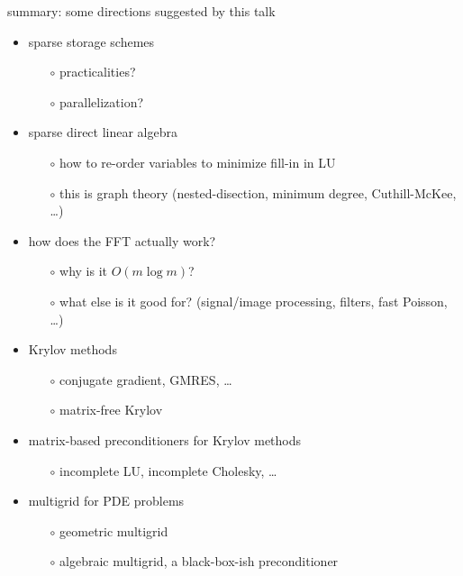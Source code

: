 \documentclass[10pt,
               svgnames,
               hyperref={colorlinks,citecolor=DeepPink4,linkcolor=FireBrick,urlcolor=Maroon},
               usepdftitle=false]{beamer}
\begin{document}
\begin{frame}{summary: some directions suggested by this talk}

\begin{itemize}
\item sparse storage schemes
   \begin{itemize}
   \item[$\circ$] practicalities?
   \item[$\circ$] parallelization?
   \end{itemize}
\item sparse direct linear algebra
   \begin{itemize}
   \item[$\circ$] how to re-order variables to minimize fill-in in LU
   \item[$\circ$] this is graph theory (nested-disection, minimum degree, Cuthill-McKee, \dots)
   \end{itemize}
\item how does the FFT actually work?
   \begin{itemize}
   \item[$\circ$] why is it $O(m\log m)$?
   \item[$\circ$] what else is it good for? (signal/image processing, filters, fast Poisson, \dots)
   \end{itemize}
\item Krylov methods
   \begin{itemize}
   \item[$\circ$] conjugate gradient, GMRES, \dots
   \item[$\circ$] matrix-free Krylov
   \end{itemize}
\item matrix-based preconditioners for Krylov methods
   \begin{itemize}
   \item[$\circ$] incomplete LU, incomplete Cholesky, \dots
   \end{itemize}
\item multigrid for PDE problems
   \begin{itemize}
   \item[$\circ$] geometric multigrid
   \item[$\circ$] algebraic multigrid, a black-box-ish preconditioner
   \end{itemize}
\end{itemize}
\end{frame}
\end{document}
